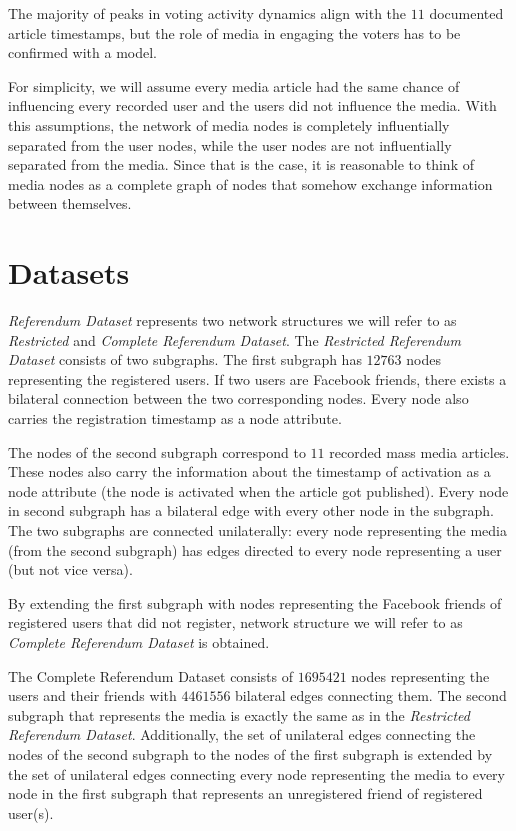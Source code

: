 \documentclass[times, utf8, zavrsni]{fer}
\begin{document}
 The majority of peaks in voting activity dynamics align with the $11$ documented article timestamps, but the role of media in engaging the voters has to be confirmed with a model. 
 
For simplicity, we will assume every media article had the same chance of influencing every recorded user and the users did not influence the media. With this assumptions, the network of media nodes is completely influentially separated from the user nodes, while the user nodes are not influentially separated from the media. Since that is the case, it is reasonable to think of media nodes as a complete graph of nodes that somehow exchange information between themselves.    
 
\section{Datasets}
\emph{Referendum Dataset} represents two network structures we will refer    to as  \emph{Restricted} and \emph{Complete Referendum Dataset}. 
The \emph{Restricted Referendum Dataset} consists of two subgraphs. The first subgraph has $12763$ nodes representing the registered users. If two users are Facebook friends, there exists a bilateral connection between the two corresponding nodes. Every node also carries the  registration timestamp as a node attribute. 

The nodes of the second subgraph correspond to $11$ recorded mass media articles. These nodes also carry the information about the timestamp of activation as a node attribute (the node is activated when the article got published). Every node in second subgraph has a bilateral edge with every other node in the subgraph. The two subgraphs are connected unilaterally: every node  representing the media (from the  second subgraph) has edges directed to every node representing a user (but not vice versa).

By extending the first subgraph with nodes representing the Facebook friends of registered users that did not  register, network structure we will refer to as \emph{Complete  Referendum Dataset} is obtained. 

The Complete Referendum Dataset consists of $1695421$ nodes representing the users and their friends with $4461556$ bilateral edges connecting them. The second subgraph that represents the media is exactly the same as in the \emph{Restricted Referendum Dataset}. Additionally, the set of  unilateral edges connecting  the nodes of the second subgraph to the nodes of the first subgraph is extended by the set of unilateral edges connecting every node representing the media to every node in the first subgraph that represents an unregistered friend of registered user(s).
\end{document}

